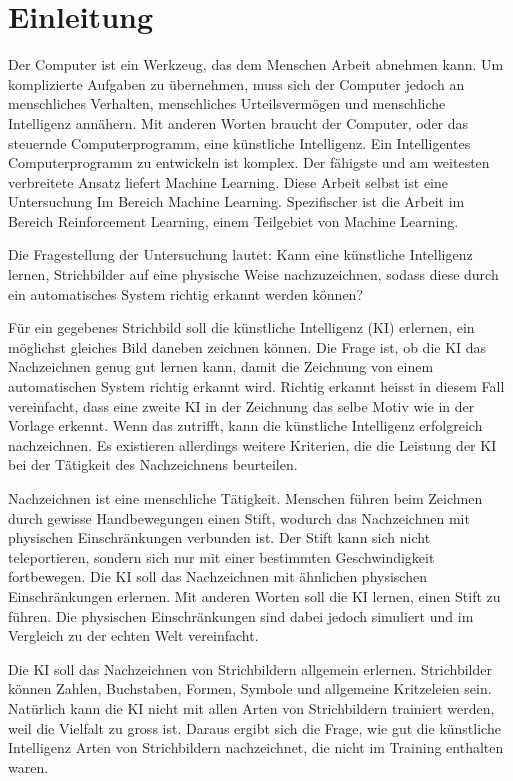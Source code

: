 \chapter{Einleitung}\label{chap:einleit}
Der Computer ist ein Werkzeug, das dem Menschen Arbeit abnehmen kann. Um
komplizierte Aufgaben zu übernehmen, muss sich der Computer jedoch an
menschliches Verhalten, menschliches Urteilsvermögen und menschliche Intelligenz
annähern. Mit anderen Worten braucht der Computer, oder das steuernde
Computerprogramm, eine künstliche Intelligenz. Ein Intelligentes
Computerprogramm zu entwickeln ist komplex. Der fähigste und am weitesten
verbreitete Ansatz liefert Machine Learning. Diese Arbeit selbst ist eine
Untersuchung Im Bereich Machine Learning. Spezifischer ist die Arbeit im Bereich
Reinforcement Learning, einem Teilgebiet von Machine Learning.

Die Fragestellung der Untersuchung lautet: Kann eine künstliche Intelligenz
lernen, Strichbilder auf eine physische Weise nachzuzeichnen, sodass diese durch
ein automatisches System richtig erkannt werden können?

Für ein gegebenes Strichbild soll die künstliche Intelligenz (KI) erlernen, ein
möglichst gleiches Bild daneben zeichnen können. Die Frage ist, ob die KI das
Nachzeichnen genug gut lernen kann, damit die Zeichnung von einem automatischen
System richtig erkannt wird. Richtig erkannt heisst in diesem Fall vereinfacht,
dass eine zweite KI in der Zeichnung das selbe Motiv wie in der Vorlage erkennt.
Wenn das zutrifft, kann die künstliche Intelligenz erfolgreich nachzeichnen. Es
existieren allerdings weitere Kriterien, die die Leistung der KI bei der
Tätigkeit des Nachzeichnens beurteilen.

Nachzeichnen ist eine menschliche Tätigkeit. Menschen führen beim Zeichnen durch
gewisse Handbewegungen einen Stift, wodurch das Nachzeichnen mit physischen
Einschränkungen verbunden ist. Der Stift kann sich nicht teleportieren, sondern
sich nur mit einer bestimmten Geschwindigkeit fortbewegen. Die KI soll das
Nachzeichnen mit ähnlichen physischen Einschränkungen erlernen. Mit anderen
Worten soll die KI lernen, einen Stift zu führen.  Die
physischen Einschränkungen sind dabei jedoch simuliert und im Vergleich zu der
echten Welt vereinfacht. 

Die KI soll das Nachzeichnen von Strichbildern allgemein erlernen. Strichbilder
können Zahlen, Buchstaben, Formen, Symbole und allgemeine Kritzeleien sein.
Natürlich kann die KI nicht mit allen Arten von Strichbildern trainiert werden,
weil die Vielfalt zu gross ist. Daraus ergibt sich die Frage, wie gut die
künstliche Intelligenz Arten von Strichbildern nachzeichnet, die nicht im
Training enthalten waren.

